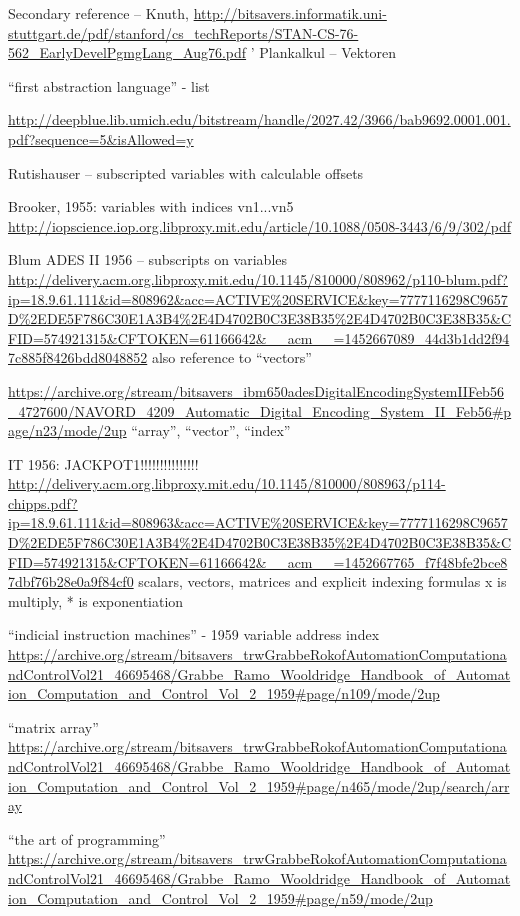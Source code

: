Secondary reference – Knuth,
\url{http://bitsavers.informatik.uni-stuttgart.de/pdf/stanford/cs_techReports/STAN-CS-76-562_EarlyDevelPgmgLang_Aug76.pdf}
'
Plankalkul – Vektoren


``first abstraction language'' - list

\url{http://deepblue.lib.umich.edu/bitstream/handle/2027.42/3966/bab9692.0001.001.pdf?sequence=5&isAllowed=y}

Rutishauser – subscripted variables with calculable offsets

Brooker, 1955: variables with indices vn1...vn5
\url{http://iopscience.iop.org.libproxy.mit.edu/article/10.1088/0508-3443/6/9/302/pdf}

Blum ADES II 1956 – subscripts on variables
\url{http://delivery.acm.org.libproxy.mit.edu/10.1145/810000/808962/p110-blum.pdf?ip=18.9.61.111&id=808962&acc=ACTIVE%20SERVICE&key=7777116298C9657D%2EDE5F786C30E1A3B4%2E4D4702B0C3E38B35%2E4D4702B0C3E38B35&CFID=574921315&CFTOKEN=61166642&__acm__=1452667089_44d3b1dd2f947c885f8426bdd8048852}
also reference to “vectors”

\url{https://archive.org/stream/bitsavers_ibm650adesDigitalEncodingSystemIIFeb56_4727600/NAVORD_4209_Automatic_Digital_Encoding_System_II_Feb56#page/n23/mode/2up}
“array”, “vector”, “index”

IT 1956: JACKPOT1!!!!!!!!!!!!!!!
\url{http://delivery.acm.org.libproxy.mit.edu/10.1145/810000/808963/p114-chipps.pdf?ip=18.9.61.111&id=808963&acc=ACTIVE%20SERVICE&key=7777116298C9657D%2EDE5F786C30E1A3B4%2E4D4702B0C3E38B35%2E4D4702B0C3E38B35&CFID=574921315&CFTOKEN=61166642&__acm__=1452667765_f7f48bfe2bce87dbf76b28e0a9f84cf0}
scalars, vectors, matrices  and explicit indexing formulas
x is multiply, * is exponentiation


“indicial instruction machines” - 1959
variable address index
\url{https://archive.org/stream/bitsavers_trwGrabbeRokofAutomationComputationandControlVol21_46695468/Grabbe_Ramo_Wooldridge_Handbook_of_Automation_Computation_and_Control_Vol_2_1959#page/n109/mode/2up}

“matrix array”
\url{https://archive.org/stream/bitsavers_trwGrabbeRokofAutomationComputationandControlVol21_46695468/Grabbe_Ramo_Wooldridge_Handbook_of_Automation_Computation_and_Control_Vol_2_1959#page/n465/mode/2up/search/array}

“the art of programming”
\url{https://archive.org/stream/bitsavers_trwGrabbeRokofAutomationComputationandControlVol21_46695468/Grabbe_Ramo_Wooldridge_Handbook_of_Automation_Computation_and_Control_Vol_2_1959#page/n59/mode/2up}

